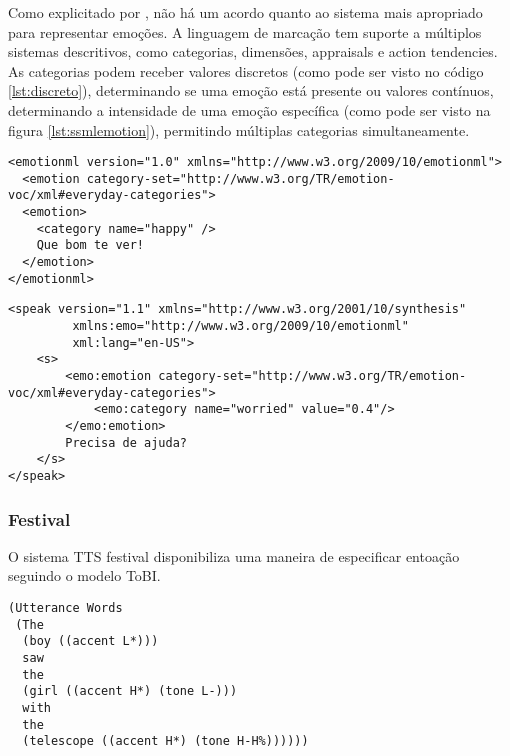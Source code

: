 Como explicitado por \cite{taylor2009}, não há um acordo quanto ao sistema mais
apropriado para representar emoções. A linguagem de marcação tem suporte a
múltiplos sistemas descritivos, como categorias, dimensões, appraisals e action
tendencies. As categorias podem receber valores discretos (como pode ser visto
no código \ref{lst:discreto}), determinando se uma emoção está presente ou valores
contínuos, determinando a intensidade de uma emoção específica (como pode ser
visto na figura \ref{lst:ssmlemotion}), permitindo
múltiplas categorias simultaneamente.


\begin{lstlisting}[caption=Exemplo de texto anotado com EmotionML com parâmetros
  discretos, label=lst:discreto]
<emotionml version="1.0" xmlns="http://www.w3.org/2009/10/emotionml">
  <emotion category-set="http://www.w3.org/TR/emotion-voc/xml#everyday-categories">
  <emotion>
    <category name="happy" />
    Que bom te ver!
  </emotion>
</emotionml>
\end{lstlisting}

\begin{lstlisting}[caption=Exemplo de texto anotado com SSML e EmotionML
  (adaptado de \cite{emotionml}), label=lst:ssmlemotion]
<speak version="1.1" xmlns="http://www.w3.org/2001/10/synthesis"
         xmlns:emo="http://www.w3.org/2009/10/emotionml"
         xml:lang="en-US">
    <s>
        <emo:emotion category-set="http://www.w3.org/TR/emotion-voc/xml#everyday-categories">
            <emo:category name="worried" value="0.4"/>
        </emo:emotion>
        Precisa de ajuda?
    </s>
</speak>
\end{lstlisting}


\subsubsection{Festival}
O sistema TTS festival disponibiliza uma maneira de especificar entoação
seguindo o modelo ToBI.

\begin{lstlisting}[caption=Anotações no modelo ToBI para o sistema TTS Festival]
(Utterance Words 
 (The
  (boy ((accent L*)))
  saw
  the
  (girl ((accent H*) (tone L-)))
  with 
  the
  (telescope ((accent H*) (tone H-H%))))))
\end{lstlisting}